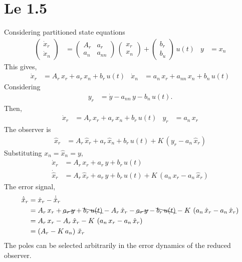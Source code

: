 \section{Le 1.5}
Considering partitioned state equations 
\begin{align*}
    \begin{pmatrix}
        \dot x_r \\ \dot x_n 
    \end{pmatrix} &= \begin{pmatrix}
        A_r & a_r \\ a_n & a_{nn} 
    \end{pmatrix}\,\begin{pmatrix}
        x_r \\ x_n 
    \end{pmatrix} + \begin{pmatrix}
        b_r \\ b_u 
    \end{pmatrix}\,u(t) & y &= x_n
\end{align*} 
This gives, 
\begin{align*}
    \dot x_r &= A_r\,x_r + a_r\,x_n + b_r\,u(t) & \dot x_n &= a_n\,x_r + a_{nn}\,x_n + b_n\,u(t)
\end{align*}
Considering 
\begin{align*}
    y_r &= \dot y - a_{nn}\,y - b_n\,u(t).
\end{align*}
Then, 
\begin{align*}
    \dot x_r &= A_r\,x_r + a_r\,x_n + b_r\,u(t) & y_r &= a_n\,x_r
\end{align*}
The observer is 
\begin{align*}
    \hat x_r &= A_r\,\hat x_r + a_r\,\hat x_n + b_r\,u(t) + K\,\left(y_r - a_n\,\hat x_r\right)
\end{align*}
Substituting $x_n = \hat x_n = y$,
\begin{align*}
    \dot x_r &= A_r\,x_r + a_r\,y + b_r\,u(t) \\
    \dot{\hat x}_r &= A_r\,\hat x_r + a_r\,y + b_r\,u(t) + K\,\left(a_n\,x_r - a_n\,\hat x_r\right)
\end{align*}
The error signal,
\begin{align*}
    \dot{\tilde x}_r &= \dot x_r - \dot{\hat x}_r \\
    &= A_r\,x_r + \cancel{a_r\,y} + \bcancel{b_r\,u(t)} - A_r\,\hat x_r - \cancel{a_r\,y} - \bcancel{b_r\,u(t)} - K\,\left(a_n\,\hat x_r - a_n\,\hat x_r\right) \\
    &= A_r\,x_r - A_r\,\hat x_r - K\,\left(a_n\,x_r - a_n\,\hat x_r\right) \\
    & = \left(A_r - K\,a_n\right)\,\tilde{x}_r
\end{align*}
The poles can be selected arbitrarily in the error dynamics of the reduced observer.